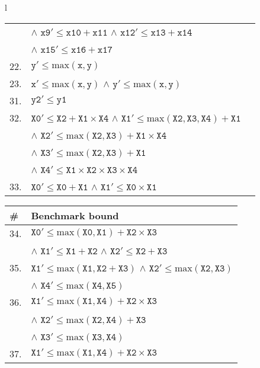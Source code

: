 \begin{table}[p]
{\begin{tabular}{l}
\begin{tabular}{p{.6cm}lp{1cm}}
     & $\land$ $\texttt{x9}' \leq \texttt{x10}+\texttt{x11}$ $\land$ $\texttt{x12}' \leq \texttt{x13}+\texttt{x14}$ \\
     & $\land$ $\texttt{x15}' \leq \texttt{x16}+\texttt{x17}$ \\
 22. & $\texttt{y}' \leq \text{max}(\texttt{x},\texttt{y})$ \\
 23. & $\texttt{x}' \leq \text{max}(\texttt{x},\texttt{y})$ $\land$ $\texttt{y}' \leq \text{max}(\texttt{x},\texttt{y})$ \\
 31. & $\texttt{y2}' \leq \texttt{y1}$ \\
 32. & $\texttt{X0}' \leq \texttt{X2}+\texttt{X1}\times\texttt{X4}$ $\land$ $\texttt{X1}' \leq \text{max}(\texttt{X2},\texttt{X3},\texttt{X4})+\texttt{X1}$ \\
     & $\land$ $\texttt{X2}' \leq \text{max}(\texttt{X2},\texttt{X3})+\texttt{X1}\times\texttt{X4}$ \\
     & $\land$ $\texttt{X3}' \leq \text{max}(\texttt{X2},\texttt{X3})+\texttt{X1}$ \\
     & $\land$ $\texttt{X4}' \leq \texttt{X1}\times\texttt{X2}\times\texttt{X3}\times\texttt{X4}$ \\
 33. & $\texttt{X0}' \leq \texttt{X0}+\texttt{X1}$ $\land$ $\texttt{X1}' \leq \texttt{X0}\times\texttt{X1}$ \\
\end{tabular}\begin{tabular}{p{.6cm}l}
 \textbf{\#} & \textbf{Benchmark bound}\\ 
 \midrule
 34. & $\texttt{X0}' \leq \text{max}(\texttt{X0},\texttt{X1})+\texttt{X2}\times\texttt{X3}$ \\
     & $\land$ $\texttt{X1}' \leq \texttt{X1}+\texttt{X2}$ $\land$ $\texttt{X2}' \leq \texttt{X2}+\texttt{X3}$ \\
 35. & $\texttt{X1}' \leq \text{max}(\texttt{X1},\texttt{X2}+\texttt{X3})$ $\land$ $\texttt{X2}' \leq \text{max}(\texttt{X2},\texttt{X3})$ \\
     & $\land$ $\texttt{X4}' \leq \text{max}(\texttt{X4},\texttt{X5})$ \\
 36. & $\texttt{X1}' \leq \text{max}(\texttt{X1},\texttt{X4})+\texttt{X2}\times\texttt{X3}$ \\
     & $\land$ $\texttt{X2}' \leq \text{max}(\texttt{X2},\texttt{X4})+\texttt{X3}$ \\
     & $\land$ $\texttt{X3}' \leq \text{max}(\texttt{X3},\texttt{X4})$ \\
 37. & $\texttt{X1}' \leq \text{max}(\texttt{X1},\texttt{X4})+\texttt{X2}\times\texttt{X3}$ \\

\end{tabular}
\end{tabular}}
\end{table}
